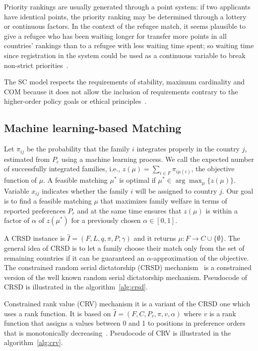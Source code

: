 Priority rankings are usually generated through a point system: if two applicants have identical points, the priority ranking may be determined through a lottery or continuous factors.
In the context  of the refugee match, it seems plausible to give a refugee who has been waiting longer for transfer  more points in all countries’ rankings than to a refugee with less waiting time spent;
so waiting time since registration in the system could be used as a continuous variable to break non-strict priorities~\cite{basshuysen}.

The SC model respects the requirements of stability, maximum cardinality and COM because it does not allow the inclusion of requirements contrary to the higher-order policy goals or ethical principles~\cite{basshuysen}.


\subsection{Machine learning-based Matching}\label{machine-learning-based-matching}%

Let \(\pi_{ij}\) be the probability that the family \(i\) integrates properly in the country \(j\), estimated from \(P_c\) using a machine learning process.
We call the expected number of successfully integrated families, i.e., \(z (\mu) = \sum_{i \in F} \pi_{i \mu (i)}\), the objective function of \(\mu\). A feasible matching \(\mu^*\) is optimal if \(\mu^* \in \arg\max_{\mu} \{z (\mu)\}\).
Variable \(x_{ij}\) indicates whether the family \(i\) will be assigned to country \(j\).
Our goal is to find a feasible matching \(\mu\) that maximizes family welfare in terms of reported preferences \(P_r\) and at the same time ensures that \(z (\mu)\) is within a factor of \(\alpha\) of \(z \left( \mu^* \right) \) for a previously chosen \(\alpha \in [0,1]\).

A CRSD instance is \(\hat {I} = (F, L, q, \pi, P, \gamma)\) and it returns \(\mu : F \rightarrow C \cup \{\emptyset\}\).
The general idea of CRSD is to let a family choose their match only from the set of remaining countries if it can be guaranteed an \(\alpha\)-approximation of the objective.
The constrained random serial dictatorship (CRSD) mechanism~\cite{bansak_2018} is a constrained version of the well known random serial dictatorship mechanism.
Pseudocode of CRSD is illustrated in the algorithm~\ref{alg:crsd}.

Constrained rank value (CRV) mechanism it is a variant of the CRSD one which uses a rank function.
It is based on \(\hat {I} = ( F , C , P_r , \pi  ,v, \alpha )\) where \(v\) is a rank function that assigns a values between 0 and 1 to positions in preference orders that is monotonically decreasing~\cite{olbergml}.
Pseudocode of CRV is illustrated in the algorithm~\ref{alg:crv}.

